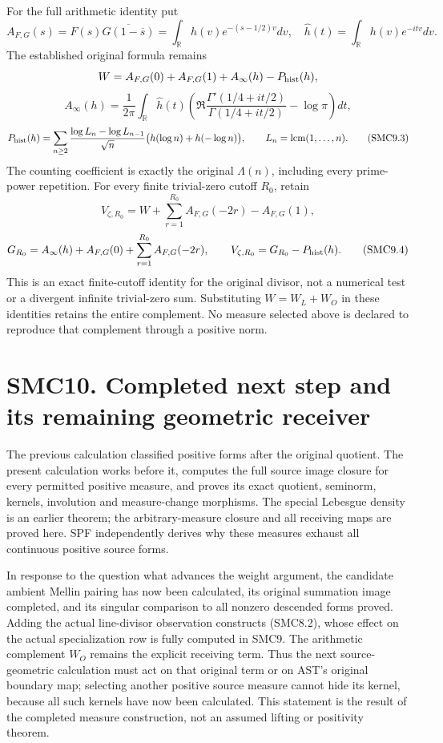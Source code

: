 For the full arithmetic identity put \[
A_{F,G}(s)=F(s)\overline{G(1-\overline s)}
=\int_{\mathbb R}h(v)e^{-(s-1/2)v}dv,
\quad\widehat h(t)=\int_{\mathbb R}h(v)e^{-itv}dv.
\] The established original formula remains \[
W=A_{F,G}(0)+A_{F,G}(1)+A_\infty(h)-P_{\rm hist}(h),
\] \[
A_\infty(h)=\frac1{2\pi}\int_{\mathbb R}\widehat h(t)
\left(\Re\frac{\Gamma'(1/4+it/2)}{\Gamma(1/4+it/2)}-\log\pi\right)dt,
\] \[
P_{\rm hist}(h)=\sum_{n\ge2}\frac{\log L_n-\log L_{n-1}}{\sqrt n}
\bigl(h(\log n)+h(-\log n)\bigr),\qquad L_n=\operatorname{lcm}(1,\ldots,n).
\tag{SMC9.3}
\] The counting coefficient is exactly the original \(\Lambda(n)\),
including every prime-power repetition. For every finite trivial-zero
cutoff \(R_0\), retain \[
V_{\zeta,R_0}=W+\sum_{r=1}^{R_0}A_{F,G}(-2r)-A_{F,G}(1),
\] \[
G_{R_0}=A_\infty(h)+A_{F,G}(0)+\sum_{r=1}^{R_0}A_{F,G}(-2r),
\qquad V_{\zeta,R_0}=G_{R_0}-P_{\rm hist}(h).
\tag{SMC9.4}
\] This is an exact finite-cutoff identity for the original divisor, not
a numerical test or a divergent infinite trivial-zero sum. Substituting
\(W=W_L+W_O\) in these identities retains the entire complement. No
measure selected above is declared to reproduce that complement through
a positive norm.

\section{SMC10. Completed next step and its remaining geometric
receiver}\label{smc10.-completed-next-step-and-its-remaining-geometric-receiver}

The previous calculation classified positive forms after the original
quotient. The present calculation works before it, computes the full
source image closure for every permitted positive measure, and proves
its exact quotient, seminorm, kernels, involution and measure-change
morphisms. The special Lebesgue density is an earlier theorem; the
arbitrary-measure closure and all receiving maps are proved here. SPF
independently derives why these measures exhaust all continuous positive
source forms.

In response to the question what advances the weight argument, the
candidate ambient Mellin pairing has now been calculated, its original
summation image completed, and its singular comparison to all nonzero
descended forms proved. Adding the actual line-divisor observation
constructs (SMC8.2), whose effect on the actual specialization row is
fully computed in SMC9. The arithmetic complement \(W_O\) remains the
explicit receiving term. Thus the next source-geometric calculation must
act on that original term or on AST's original boundary map; selecting
another positive source measure cannot hide its kernel, because all such
kernels have now been calculated. This statement is the result of the
completed measure construction, not an assumed lifting or positivity
theorem.

